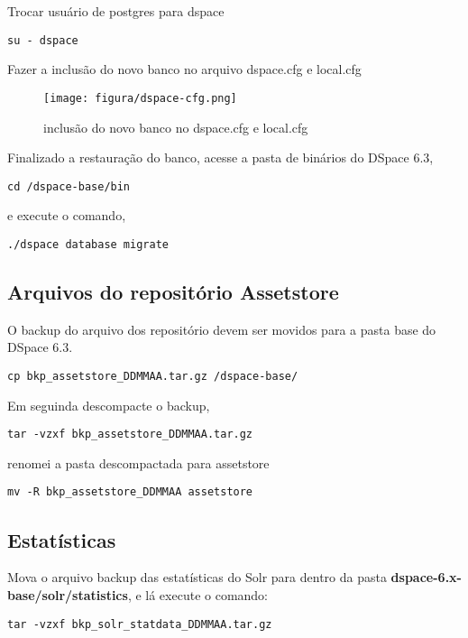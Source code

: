 \documentclass[12pt,hidelinks]{article}
\begin{document}
Trocar usuário de postgres para dspace

\begin{verbatim}
su - dspace
\end{verbatim}

Fazer a inclusão do novo banco no arquivo dspace.cfg e local.cfg

\begin{figure}[!htp]
                \centering
                \texttt{[image: figura/dspace-cfg.png]}
                \caption{inclusão do novo banco no dspace.cfg e local.cfg}
            \label{Rotulo}
          \end{figure}

Finalizado a restauração do banco, acesse a pasta de binários do DSpace 6.3,
\begin{verbatim}
cd /dspace-base/bin
\end{verbatim}
e execute o comando,
\begin{verbatim}
./dspace database migrate
\end{verbatim}

\subsection{Arquivos do repositório Assetstore}

O backup do arquivo dos repositório devem ser movidos para a pasta base do DSpace 6.3.
\begin{verbatim}
cp bkp_assetstore_DDMMAA.tar.gz /dspace-base/
\end{verbatim}
Em seguinda descompacte o backup,
\begin{verbatim}
tar -vzxf bkp_assetstore_DDMMAA.tar.gz
\end{verbatim}
renomei a pasta descompactada para assetstore
\begin{verbatim}
mv -R bkp_assetstore_DDMMAA assetstore 
\end{verbatim}


\subsection{Estatísticas}

Mova o arquivo backup das estatísticas do Solr para dentro da pasta \textbf{dspace-6.x-base/solr/statistics}, e lá execute o comando:

\begin{verbatim}
tar -vzxf bkp_solr_statdata_DDMMAA.tar.gz
\end{verbatim}
\end{document}
